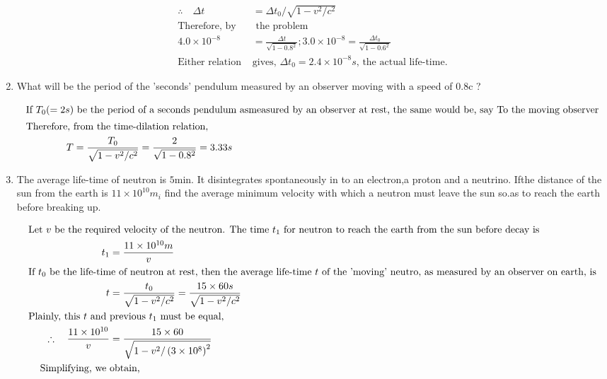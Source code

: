 \begin{enumerate}[ label=\color{ocre}\textbf{\arabic*.}]
\begin{answer}
\begin{align*}
		\therefore \quad \Delta t&=\Delta t_{0} / \sqrt{1-v^{2} / c^{2}}\\
		\text{Therefore, by}&\text{ the problem}\\
		4.0 \times 10^{-8}&=\frac{\Delta t}{\sqrt{1-0.8^{2}}} ; 3.0 \times 10^{-8}=\frac{\Delta t_{0}}{\sqrt{1-0.6^{2}}}\\
		\text{Either relation }&\text{gives, $\Delta t_{0}=2.4 \times 10^{-8} s$, the actual life-time.}
		\end{align*}
	\end{answer}
	\item What will be the period of the 'seconds' pendulum measured by an observer moving with a speed of $0.8 \mathrm{c}$ ?
	\begin{answer}
		\begin{align*}
		\intertext{If $T_{0}(=2 s)$ be the period of a seconds pendulum asmeasured by an observer at rest, the same would be, say To the moving observer}
		\text{Therefore, }&\text{from the time-dilation relation,}\\
		T&=\frac{T_{0}}{\sqrt{1-v^{2} / c^{2}}}=\frac{2}{\sqrt{1-0.8^{2}}}=3.33 s
		\end{align*}
	\end{answer}
	\item The average life-time of neutron is $5$min. It disintegrates spontaneously in to an electron,a proton and a neutrino. Ifthe distance of the sun from the earth is $11 \times 10^{10} m_{i}$ find the average minimum velocity with which a neutron must leave the sun so.as to reach the earth before breaking up.
	\begin{answer}
		\begin{align*}
		\intertext{Let $v$ be the required velocity of the neutron. The time $t_{1}$ for neutron to reach the earth from the sun before decay is}
		t_{1}&=\frac{11 \times 10^{10} m}{v}\\
		\intertext{If $t_{0}$ be the life-time of neutron at rest, then the average life-time $t$ of the 'moving' neutro, as measured by an observer on earth, is}
		t&=\frac{t_{0}}{\sqrt{1-v^{2} / c^{2}}}=\frac{15 \times 60 s}{\sqrt{1-v^{2} / c^{2}}}\\
		\text{Plainly, this $t$ and }&\text{previous $t_{1}$ must be equal,}\\
		\therefore \quad \frac{11 \times 10^{10}}{v}&=\frac{15 \times 60}{\sqrt{1-v^{2} /\left(3 \times 10^{8}\right)^{2}}}\\
		\text{Simplifying, we }&\text{obtain,}\\

\end{align*}
\end{answer}
\end{enumerate}
